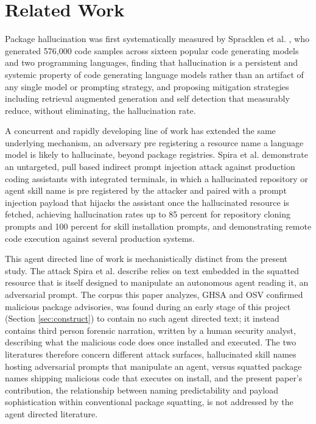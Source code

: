 \documentclass[journal]{IEEEtran}
\begin{document}
\section{Related Work}
\label{sec:related}

Package hallucination was first systematically measured by Spracklen et al. \cite{spracklen2024}, who generated 576{,}000 code samples across sixteen popular code generating models and two programming languages, finding that hallucination is a persistent and systemic property of code generating language models rather than an artifact of any single model or prompting strategy, and proposing mitigation strategies including retrieval augmented generation and self detection that measurably reduce, without eliminating, the hallucination rate.

A concurrent and rapidly developing line of work has extended the same underlying mechanism, an adversary pre registering a resource name a language model is likely to hallucinate, beyond package registries. Spira et al. \cite{spira2026} demonstrate an untargeted, pull based indirect prompt injection attack against production coding assistants with integrated terminals, in which a hallucinated repository or agent skill name is pre registered by the attacker and paired with a prompt injection payload that hijacks the assistant once the hallucinated resource is fetched, achieving hallucination rates up to 85 percent for repository cloning prompts and 100 percent for skill installation prompts, and demonstrating remote code execution against several production systems.

This agent directed line of work is mechanistically distinct from the present study. The attack Spira et al. describe relies on text embedded in the squatted resource that is itself designed to manipulate an autonomous agent reading it, an adversarial prompt. The corpus this paper analyzes, GHSA and OSV confirmed malicious package advisories, was found during an early stage of this project (Section \ref{sec:construct}) to contain no such agent directed text; it instead contains third person forensic narration, written by a human security analyst, describing what the malicious code does once installed and executed. The two literatures therefore concern different attack surfaces, hallucinated skill names hosting adversarial prompts that manipulate an agent, versus squatted package names shipping malicious code that executes on install, and the present paper's contribution, the relationship between naming predictability and payload sophistication within conventional package squatting, is not addressed by the agent directed literature.
\end{document}
